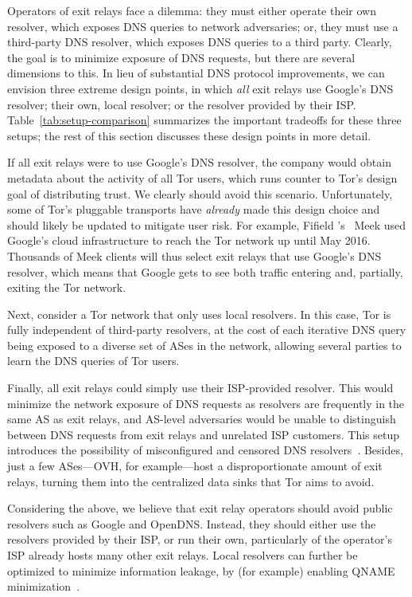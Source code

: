 Operators of exit relays face a dilemma: they must either operate their own
resolver, which exposes DNS queries to network adversaries; or, they
must use a third-party DNS resolver, which exposes DNS queries to a
third party.  Clearly, the goal is to minimize exposure of DNS requests,
but there are several dimensions to this.  In lieu of substantial DNS
protocol improvements, we can envision three extreme design points,
in which \emph{all} exit relays use \first Google's DNS resolver;
\second their own, local resolver; or \third the resolver provided by
their ISP.  Table~\ref{tab:setup-comparison}
summarizes the important tradeoffs for these three setups; the rest of
this section discusses these design points in more detail.

If all exit relays were to use Google's DNS resolver, the company would
obtain metadata about the activity of all Tor users, which runs counter to
Tor's design goal of distributing trust.  We clearly should avoid this
scenario. Unfortunately, some of Tor's pluggable transports
have {\em already} made this design choice and should likely be updated
to mitigate user risk.  For example, Fifield \ea's~\cite{Fifield2015a}
Meek used Google's cloud infrastructure
to reach the Tor network up until May 2016.
Thousands of Meek clients
will thus select exit relays that use Google's DNS resolver, which means that Google
gets to see both traffic entering and, partially, exiting the Tor
network.

Next, consider a Tor network that only uses local resolvers.  In this
case, Tor is fully independent of third-party resolvers, at the cost of
each iterative DNS query being exposed to a diverse set of ASes in the
network, allowing several parties to learn the DNS queries of Tor users.

Finally, all exit
relays could simply use their ISP-provided resolver.  This would minimize the
network exposure of DNS requests as resolvers are frequently in the same AS as
exit relays, and AS-level adversaries would be unable to distinguish
between DNS requests from exit relays and unrelated ISP customers.  This
setup introduces the possibility of misconfigured and censored DNS
resolvers~\cite[\S~4.1]{Winter2014b}.  Besides, just a few ASes---OVH, for
example---host a disproportionate amount of exit relays, turning them into the
centralized data sinks that Tor aims to avoid.

Considering the above, we believe that exit relay operators should avoid
public resolvers such as Google and OpenDNS.  Instead, they should
either use the resolvers provided by their ISP, or run their own,
particularly of the operator's
ISP already hosts many other exit relays.  Local
resolvers can further be optimized to minimize information leakage,
by (for example) enabling QNAME minimization~\cite{qname-minimization}.

